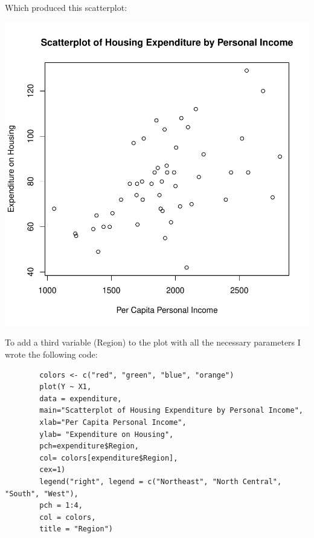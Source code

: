 \documentclass[12pt,letterpaper]{article}
\begin{document}
     Which produced this scatterplot:
\begin{center}
\includegraphics{incomeXexpenditureSPbase}
\end{center}

    To add a third variable (Region) to the plot with all the necessary parameters I wrote the following code:
    \begin{Verbatim}
    	colors <- c("red", "green", "blue", "orange")
    	plot(Y ~ X1,
    	data = expenditure,
    	main="Scatterplot of Housing Expenditure by Personal Income",
    	xlab="Per Capita Personal Income",
    	ylab= "Expenditure on Housing",
    	pch=expenditure$Region,
    	col= colors[expenditure$Region],
    	cex=1)
    	legend("right", legend = c("Northeast", "North Central", "South", "West"), 
    	pch = 1:4,  
    	col = colors,  
    	title = "Region")
    \end{Verbatim}
    
\end{document}
